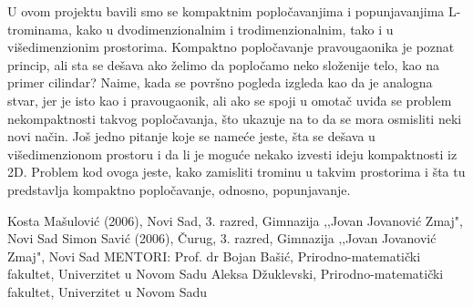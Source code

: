 
\renewcommand{\figurename}{Slika}
\renewcommand{\tablename}{Tabela}
\renewcommand{\proofname}{Dokaz}
\renewcommand{\abstractname}{Sažetak}
\renewcommand{\refname}{Literatura}


\begin{Abstract}

U ovom projektu bavili smo se kompaktnim popločavanjima i popunjavanjima L-trominama, kako u dvodimenzionalnim i trodimenzionalnim, tako i u višedimenzionim prostorima. Kompaktno popločavanje pravougaonika je poznat princip, ali sta se dešava ako želimo da popločamo neko složenije telo, kao na primer cilindar? Naime, kada se površno pogleda izgleda kao da je analogna stvar, jer je isto kao i pravougaonik, ali ako se spoji u omotač uviđa se problem nekompaktnosti takvog popločavanja, što ukazuje na to da se mora osmisliti neki novi način. Još jedno pitanje koje se nameće jeste, šta se dešava u višedimenzionom prostoru i da li je moguće nekako izvesti ideju kompaktnosti iz 2D. Problem kod ovoga jeste, kako zamisliti trominu u takvim prostorima i šta tu predstavlja kompaktno popločavanje, odnosno, popunjavanje. 

\end{Abstract}
\begin{AuthorEx}
Kosta Mašulović (2006), Novi Sad, 3. razred, Gimnazija ‚‚Jovan Jovanović Zmaj", Novi Sad
\newline
\newline
Simon Savić (2006), Čurug, 3. razred, Gimnazija ‚‚Jovan Jovanović Zmaj", Novi Sad
\newline
\newline
MENTORI:
\newline
Prof. dr Bojan Bašić, Prirodno-matematički fakultet, Univerzitet u Novom Sadu
\newline
\newline
Aleksa Džuklevski, Prirodno-matematički fakultet, Univerzitet u Novom Sadu
\end{AuthorEx}
